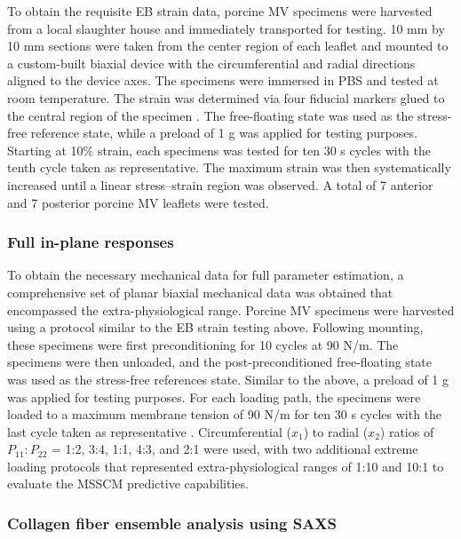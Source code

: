     
    To obtain the requisite EB strain data, porcine MV specimens were harvested from a local slaughter house and immediately transported for testing. 10 mm by 10 mm sections were taken from the center region of each leaflet and mounted to a custom-built biaxial device \cite{grashow_biaxial_2006,grashow_planar_2006} with the circumferential and radial directions aligned to the device axes. The specimens were immersed in PBS and tested at room temperature. The strain was determined via four fiducial markers glued to the central region of the specimen \cite{billiar_biaxial_2000}. The free-floating state was used as the stress-free reference state, while a preload of 1 g was applied for testing purposes. Starting at 10\% strain, each specimens was tested for ten 30 s cycles with the tenth cycle taken as representative. The maximum strain was then systematically increased until a linear stress–strain region was observed. A total of 7 anterior and 7 posterior porcine MV leaflets were tested.


\subsubsection{Full in-plane responses}

    To obtain the necessary mechanical data for full parameter estimation, a comprehensive set of planar biaxial mechanical data was obtained that encompassed the extra-physiological range. Porcine MV specimens were harvested using a protocol similar to the EB strain testing above. Following mounting, these specimens were first preconditioning for 10 cycles at 90 N/m. The specimens were then unloaded, and the post-preconditioned free-floating state was used as the stress-free references state. Similar to the above, a preload of 1 g was applied for testing purposes. For each loading path, the specimens were loaded to a maximum membrane tension of 90 N/m for ten 30 s cycles with the last cycle taken as representative \cite{grashow_biaxial_2006,grashow_planar_2006}. Circumferential ($x_1$) to radial ($x_2$) ratios of $P_{11}:P_{22}$ = 1:2, 3:4, 1:1, 4:3, and 2:1 were used, with two additional extreme loading protocols that represented extra-physiological ranges of 1:10 and 10:1 to evaluate the MSSCM predictive capabilities.
    
    
\subsubsection{Collagen fiber ensemble analysis using SAXS}

